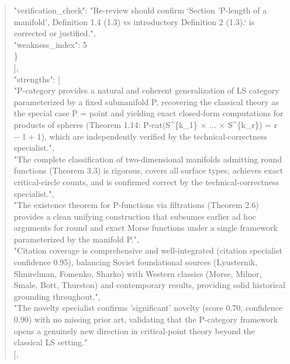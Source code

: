\documentclass[11pt]{article}
\begin{document}
\begin{quote}
      "verification\_check": "Re-review should confirm `Section 'P-length of a manifold', Definition 1.4 (1.3) vs introductory Definition 2 (1.3).` is corrected or justified.",\\
      "weakness\_index": 5\\
    \}\\
  ],\\
  "strengths": [\\
    "P-category provides a natural and coherent generalization of LS category parameterized by a fixed submanifold P, recovering the classical theory as the special case P = point and yielding exact closed-form computations for products of spheres (Theorem 1.14: P-cat(S\^{}\{k\_1\} \ensuremath{\times} ... \ensuremath{\times} S\^{}\{k\_r\}) = r \ensuremath{-} l + 1), which are independently verified by the technical-correctness specialist.",\\
    "The complete classification of two-dimensional manifolds admitting round functions (Theorem 3.3) is rigorous, covers all surface types, achieves exact critical-circle counts, and is confirmed correct by the technical-correctness specialist.",\\
    "The existence theorem for P-functions via filtrations (Theorem 2.6) provides a clean unifying construction that subsumes earlier ad hoc arguments for round and exact Morse functions under a single framework parameterized by the manifold P.",\\
    "Citation coverage is comprehensive and well-integrated (citation specialist confidence 0.95), balancing Soviet foundational sources (Lyusternik, Shnirelman, Fomenko, Sharko) with Western classics (Morse, Milnor, Smale, Bott, Thurston) and contemporary results, providing solid historical grounding throughout.",\\
    "The novelty specialist confirms 'significant' novelty (score 0.70, confidence 0.90) with no missing prior art, validating that the P-category framework opens a genuinely new direction in critical-point theory beyond the classical LS setting."\\
  ],\\

\end{quote}
\end{document}
